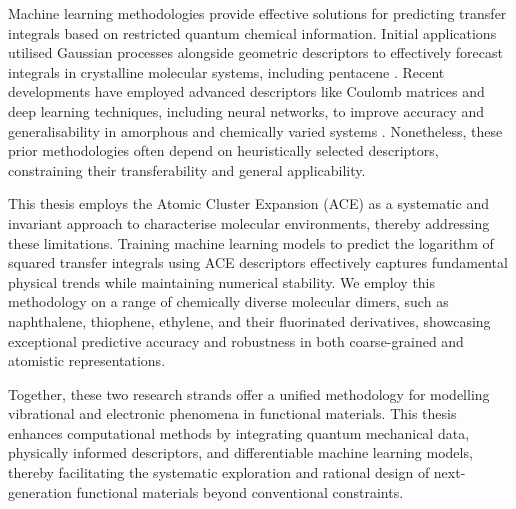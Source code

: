 Machine learning methodologies provide effective solutions for predicting transfer integrals based on restricted quantum chemical information.  Initial applications utilised Gaussian processes alongside geometric descriptors to effectively forecast integrals in crystalline molecular systems, including pentacene \cite{Lederer2018}.  Recent developments have employed advanced descriptors like Coulomb matrices and deep learning techniques, including neural networks, to improve accuracy and generalisability in amorphous and chemically varied systems \cite{Wang2019}.  Nonetheless, these prior methodologies often depend on heuristically selected descriptors, constraining their transferability and general applicability.

This thesis employs the Atomic Cluster Expansion (ACE) as a systematic and invariant approach to characterise molecular environments, thereby addressing these limitations.  Training machine learning models to predict the logarithm of squared transfer integrals using ACE descriptors effectively captures fundamental physical trends while maintaining numerical stability.  We employ this methodology on a range of chemically diverse molecular dimers, such as naphthalene, thiophene, ethylene, and their fluorinated derivatives, showcasing exceptional predictive accuracy and robustness in both coarse-grained and atomistic representations.

\vspace{1em}
Together, these two research strands offer a unified methodology for modelling vibrational and electronic phenomena in functional materials.  This thesis enhances computational methods by integrating quantum mechanical data, physically informed descriptors, and differentiable machine learning models, thereby facilitating the systematic exploration and rational design of next-generation functional materials beyond conventional constraints.


